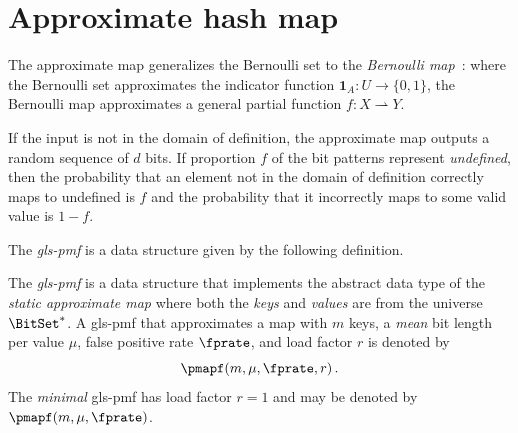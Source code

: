 \documentclass[ ../main.tex]{subfiles}
\begin{document}
\section{Approximate hash map}
\label{sec:pmf}
The approximate map generalizes the Bernoulli set to the \emph{Bernoulli map}~\cite{bmaps}: where the Bernoulli set approximates the indicator function $\mathbf{1}_A \colon U \to \{0,1\}$, the Bernoulli map approximates a general partial function $f \colon X \rightharpoonup Y$.

If the input is not in the domain of definition, the approximate map outputs a random sequence of $d$ bits. If proportion $f$ of the bit patterns represent \emph{undefined}, then the probability that an element not in the domain of definition correctly maps to undefined is $f$ and the probability that it incorrectly maps to some valid value is $1-f$.



The \emph{\gls{gls-pmf}} is a data structure given by the following definition.
\begin{definition}
The \emph{\gls{gls-pmf}} is a data structure that implements the abstract data type of the \emph{static approximate map} where both the \emph{keys} and \emph{values} are from the universe $\BitSet^*$.
A \gls{gls-pmf} that approximates a map with $m$ keys, a \emph{mean} bit length per value $\mu$, false positive rate $\fprate$, and load factor $r$ is denoted by
\begin{equation}
    \pmapf(m, \mu, \fprate, r)\,.
\end{equation}
The \emph{minimal} \gls{gls-pmf} has load factor $r=1$ and may be denoted by $\pmapf(m,\mu,\fprate)$.
\end{definition}
\end{document}
